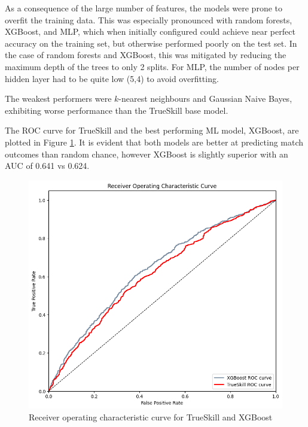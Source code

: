As a consequence of the large number of features, the models were prone to overfit the training data. This was especially pronounced with random forests, XGBoost, and MLP, which when initially configured could achieve near perfect accuracy on the training set, but otherwise performed poorly on the test set. In the case of random forests and XGBoost, this was mitigated by reducing the maximum depth of the trees to only 2 splits. For MLP, the number of nodes per hidden layer had to be quite low (5,4) to avoid overfitting.

The weakest performers were $k$-nearest neighbours and Gaussian Naive Bayes, exhibiting worse performance than the TrueSkill base model.

The ROC curve for TrueSkill and the best performing ML model, XGBoost, are plotted in Figure \ref{fig:xgb-roc}. It is evident that both models are better at predicting match outcomes than random chance, however XGBoost is slightly superior with an AUC of 0.641 vs 0.624.

\begin{figure}[h]
	\centering
	\begin{adjustbox}{center}
		\includegraphics[width=1.1\textwidth]{Figures/xgb-auc.png}
	\end{adjustbox}
	\caption{Receiver operating characteristic curve for TrueSkill and XGBoost}
	\label{fig:xgb-roc}
\end{figure}

